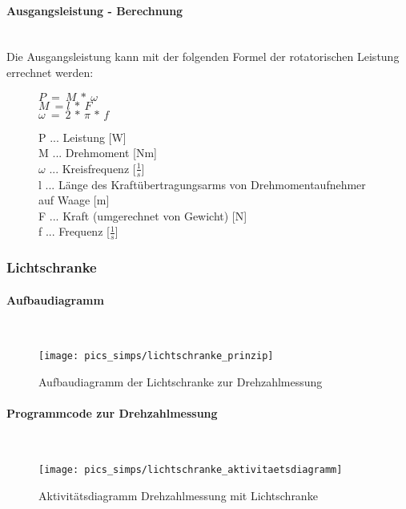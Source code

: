 \documentclass[12pt,a4paper]{article}
\begin{document}
\paragraph{Ausgangsleistung - Berechnung}\mbox{}\\
Die Ausgangsleistung kann mit der folgenden Formel der rotatorischen Leistung errechnet werden:\\
\begin{figure}[h!]
	\centering
	\huge$P\:=\:M\:*\:\omega$\vspace{0.5cm}\\
	\Large$M\:=l\:*\:F$\\
	\Large$\omega\:=\:2\,*\,\pi\,*\,f$\vspace{0.5cm}\\
	\raggedright
	\large P ... Leistung [W]\\
	\large M ... Drehmoment [Nm]\\
	\large $\omega$ ... Kreisfrequenz [$\frac{1}{s}$]\\
	\large l ... Länge des Kraftübertragungsarms von Drehmomentaufnehmer auf Waage [m]\\
	\large F ... Kraft (umgerechnet von Gewicht) [N]\\
	\large f ... Frequenz [$\frac{1}{s}$]
\end{figure}
%
%
\newpage
\subsubsection{Lichtschranke}
%
\paragraph{Aufbaudiagramm}\mbox{}\\
\begin{figure}[h!]
	\centering
	\texttt{[image: pics\_simps/lichtschranke\_prinzip]}
	\caption{Aufbaudiagramm der Lichtschranke zur Drehzahlmessung}
\end{figure}
%
%
\newpage
\paragraph{Programmcode zur Drehzahlmessung}\mbox{}\\
\begin{figure}[h!]
	\centering
	\texttt{[image: pics\_simps/lichtschranke\_aktivitaetsdiagramm]}
	\caption{Aktivitätsdiagramm Drehzahlmessung mit Lichtschranke}
\end{figure}
%
\end{document}
